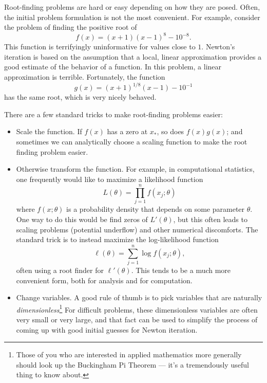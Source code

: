 \documentclass[12pt, leqno]{article} %
\begin{document}



Root-finding problems are hard or easy depending on how they are
posed.  Often, the initial problem formulation is not the most
convenient.  For example, consider the problem of finding the
positive root of
\[
  f(x) = (x+1)(x-1)^8-10^{-8}.
\]
This function is terrifyingly uninformative for values close to $1$.
Newton's iteration is based on the assumption that a local, linear
approximation provides a good estimate of the behavior of a function.
In this problem, a linear approximation is terrible.  Fortunately,
the function
\[
  g(x) = (x+1)^{1/8} (x-1)-10^{-1}
\]
has the same root, which is very nicely behaved.

There are a few standard tricks to make root-finding problems easier:
\begin{itemize}
\item 
  Scale the function.  If $f(x)$ has a zero at $x_*$, so does $f(x)
  g(x)$; and sometimes we can analytically choose a scaling function
  to make the root finding problem easier.
\item
  Otherwise transform the function.  For example, in computational
  statistics, one frequently would like to maximize a likelihood function
  \[
    L(\theta) = \prod_{j=1}^n f(x_j; \theta)
  \]
  where $f(x; \theta)$ is a probability density that depends on some
  parameter $\theta$.  One way to do this would be find zeros of
  $L'(\theta)$, but this often leads to scaling problems (potential
  underflow) and other numerical discomforts.  The standard trick is
  to instead maximize the log-likelihood function
  \[
    \ell(\theta) = \sum_{j=1}^n \log f(x_j; \theta),
  \]
  often using a root finder for $\ell'(\theta)$.  This tends to be a
  much more convenient form, both for analysis and for computation.
\item
  Change variables.  A good rule of thumb is to pick variables that
  are naturally {\em dimensionless}\footnote{%
Those of you who are interested in applied mathematics more generally
should look up the Buckingham Pi Theorem --- it's a tremendously
useful thing to know about.
}
  For difficult problems, these dimensionless variables are often very
  small or very large, and that fact can be used to simplify the
  process of coming up with good initial guesses for Newton iteration.
\end{itemize}
\end{document}
